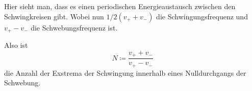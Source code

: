 Hier sieht man, dass es einen periodischen Energieaustausch zwischen den Schwingkreisen gibt. 
Wobei nun $1/2(v_+ + v_-)$ die Schwingungsfrequenz und $v_+ - v_-$ die Schwebungsfrequenz ist.\cite{V355}

Also ist 
\begin{equation}
    \label{eq:exstrema}
    N \coloneq \frac{v_+ + v_-}{v_+ - v_-}
\end{equation}
die Anzahl der Exstrema der Schwingung innerhalb eines Nulldurchgangs der Schwebung.